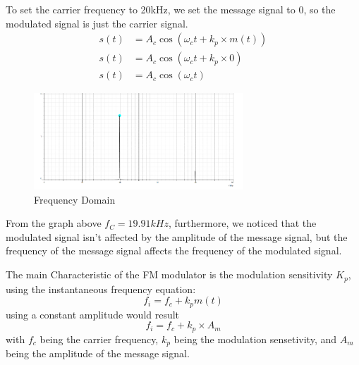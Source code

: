 \documentclass[12pt]{article}
\begin{document}
To set the carrier frequency to 20kHz, we set the message signal to 0, so the modulated signal is just the carrier signal.
\begin{equation}
    \begin{aligned}
        s(t) &= A_c \cos({\omega}_c t + k_p\times m(t)) \\
        s(t) &= A_c \cos({\omega}_c t + k_p\times 0)\\
        s(t) &= A_c \cos({\omega}_c t)
    \end{aligned}
\end{equation}
\begin{figure}[H]
    \centering
    \includegraphics[width=0.7\textwidth]{assets/frequency_domain.png}
    \caption{Frequency Domain}
\end{figure}
From the graph above $f_C = 19.91kHz$, furthermore, we noticed that the modulated signal isn't affected by the amplitude of the message signal, but the frequency of the message signal affects the frequency of the modulated signal.

The main Characteristic of the FM modulator is the modulation sensitivity $K_p$, using the instantaneous frequency equation:
\begin{equation}
    f_i = f_c + k_p m(t)
\end{equation}
using a constant amplitude would result
\begin{equation}
    f_i = f_c + k_p \times A_m
\end{equation}
with $f_c$ being the carrier frequency, $k_p$ being the modulation sensetivity, and $A_m$ being the amplitude of the message signal. 
\end{document}
